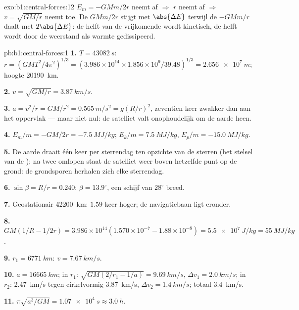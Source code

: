 \begin{solution}{exo:b1:central-forces:12}
$E_m = -GMm/2r$ neemt af $\Rightarrow$ $r$ neemt af $\Rightarrow$ $v =
\sqrt{GM/r}$ neemt toe. De  $GMm/2r$ stijgt met $\abs{\Delta E}$
terwijl de  $-GMm/r$ daalt met $2\abs{\Delta E}$: de helft van de
vrijkomende  wordt kinetisch, de helft wordt door de weerstand
als warmte gedissipeerd.
\end{solution}

\begin{solution}{pb:b1:central-forces:1}
\textbf{1.} $T = \qty{43082}{s}$: $r = (GMT^2/4\pi^2)^{1/3} = (3.986\times10^{14}
\times 1.856\times10^9/39.48)^{1/3} = \qty{2.656e7}{m}$; hoogte
\qty{20190}{km}.

\textbf{2.} $v = \sqrt{GM/r} = \qty{3.87}{km/s}$.

\textbf{3.} $a = v^2/r = GM/r^2 = \qty{0.565}{m/s^2} = g(R/r)^2$, zeventien
keer zwakker dan aan het oppervlak --- maar niet nul: de satelliet valt
onophoudelijk om de aarde heen.

\textbf{4.} $E_m/m = -GM/2r = \qty{-7.5}{MJ/kg}$; $E_k/m = \qty{+7.5}{MJ/kg}$,
$E_p/m = \qty{-15.0}{MJ/kg}$.

\textbf{5.} De aarde draait één keer per sterrendag ten opzichte van de sterren
(het stelsel van de ); na twee omlopen staat de satelliet weer boven
hetzelfde punt op de grond: de grondsporen herhalen zich elke sterrendag.

\textbf{6.} $\sin\beta = R/r = 0.240$: $\beta = 13.9^\circ$, een schijf van
$28^\circ$ breed.

\textbf{7.} Geostationair \qty{42200}{km}: $1.59$ keer hoger; de
navigatiebaan ligt eronder.

\textbf{8.} $GM(1/R - 1/2r) = 3.986\times10^{14}(1.570\times10^{-7} - 1.88\times
10^{-8}) = \qty{5.5e7}{J/kg} = \qty{55}{MJ/kg}$.

\textbf{9.} $r_1 = \qty{6771}{km}$: $v = \qty{7.67}{km/s}$.

\textbf{10.} $a = \qty{16665}{km}$; in $r_1$: $\sqrt{GM(2/r_1 - 1/a)} =
\qty{9.69}{km/s}$, $\Delta v_1 = \qty{2.0}{km/s}$; in $r_2$: \qty{2.47}{km/s}
tegen cirkelvormig \qty{3.87}{km/s}, $\Delta v_2 = \qty{1.4}{km/s}$; totaal
\qty{3.4}{km/s}.

\textbf{11.} $\pi\sqrt{a^3/GM} = \qty{1.07e4}{s} \approx \qty{3.0}{h}$.


\end{solution}
